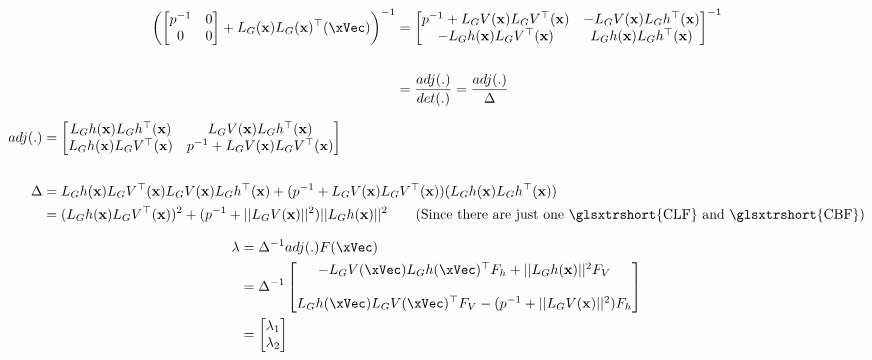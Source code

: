 \begin{align}
\left(\begin{bmatrix} p^{-1} & 0 \\ 0 & 0 \end{bmatrix} + L_G(\mathbf{x})L_G(\mathbf{x})^{\top}(\xVec)\right)^{-1} &= \begin{bmatrix} p^{-1} + L_GV(\mathbf{x}) L_GV^{\top}(\mathbf{x}) & -L_GV(\mathbf{x}) L_Gh^{\top}(\mathbf{x}) \\ -L_Gh(\mathbf{x}) L_GV^{\top}(\mathbf{x}) & L_Gh(\mathbf{x}) L_Gh^{\top}(\mathbf{x}) \end{bmatrix}^{-1} \notag \\
\notag \\
&= \frac{adj(.)}{det(.)} = \frac{adj(.)}{\Delta} \label{eq:lagrangian_gradient_auxFunction_inv}  
\end{align}



\begin{align}
adj(.) &= \begin{bmatrix} L_Gh(\mathbf{x}) L_Gh^{\top}(\mathbf{x}) & L_GV(\mathbf{x}) L_Gh^{\top}(\mathbf{x}) \\ L_Gh(\mathbf{x}) L_GV^{\top}(\mathbf{x}) & p^{-1} + L_GV(\mathbf{x}) L_GV^{\top}(\mathbf{x}) \end{bmatrix} \label{eq:lagrangian_gradient_auxFunction_adj} \\
\notag \\
\Delta &= L_Gh(\mathbf{x}) L_GV^{\top}(\mathbf{x}) L_GV(\mathbf{x}) L_Gh^{\top}(\mathbf{x}) + (p^{-1} + L_GV(\mathbf{x}) L_GV^{\top}(\mathbf{x}))(L_Gh(\mathbf{x}) L_Gh^{\top}(\mathbf{x})) \notag \\
       &= ( L_Gh(\mathbf{x}) L_GV^{\top}(\mathbf{x}) )^2 + (p^{-1} + ||L_GV(\mathbf{x})||^2 )||L_Gh(\mathbf{x})||^2 \quad \quad (\text{Since there are just one \glsxtrshort{CLF} and \glsxtrshort{CBF}}) \label{eq:lagrangian_gradient_auxFunction_det}
\end{align}



\begin{align}
\lambda &= \Delta^{-1}adj(.)F(\xVec) \notag \\
&= \Delta^{-1}  \begin{bmatrix} -L_GV(\xVec) L_Gh(\xVec)^{\top} F_h + ||L_Gh(\mathbf{x})||^2 F_V \\ \\ L_Gh(\xVec) L_GV(\xVec)^{\top}F_V - (p^{-1}+||L_GV(\mathbf{x})||^2)F_h  \end{bmatrix} \notag \\
&= \begin{bmatrix} \lambda_1 \\ \lambda_2 \end{bmatrix} \label{eq:kkt_multiplier_formula_deduc}
\end{align}

